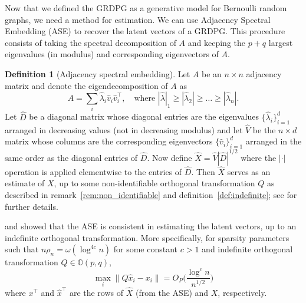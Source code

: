 \documentclass[
  11pt,
]{article}
\theoremstyle{definition}
\newtheorem{definition}{Definition}[section]
\theoremstyle{definition}
\theoremstyle{definition}
\theoremstyle{definition}
\theoremstyle{remark}
\begin{document}
Now that we defined the GRDPG as a generative model for Bernoulli random graphs,
we need a method for estimation.
We can use Adjacency Spectral Embedding (ASE) \citep{doi:10.1080/01621459.2012.699795} to recover the latent vectors of a GRDPG.
This procedure consists of taking the spectral decomposition of \(A\) and keeping the \(p + q\) largest eigenvalues (in modulus) and corresponding eigenvectors of \(A\).

\begin{definition}[Adjacency spectral embedding]
\label{def:ase}
Let $A$ be an $n
\times n$ adjacency matrix and denote the
eigendecomposition of $A$ as
$$A = \sum_{i} \hat{\lambda}_i \hat{v}_i \hat{v}_i^{\top}, \quad
\text{where} \,\,
|\hat{\lambda}|_1 \geq |\hat{\lambda}_2| \geq \dots \geq
|\hat{\lambda}_n|.$$
Let $\hat{D}$ be a diagonal matrix whose diagonal entries are
the eigenvalues $\{\hat{\lambda}_i\}_{i=1}^{d}$ arranged in decreasing values (not in
decreasing modulus) and let $\hat{V}$ be the $n \times d$ matrix whose
columns are the corresponding eigenvectors $\{\hat{v}_i\}_{i=1}^{d}$
arranged in the same order as the diagonal entries of $\hat{D}$. Now
define $\hat{X} = \hat{V} |\hat{D}|^{1/2}$ where the $|\cdot|$
operation is applied elementwise to the entries of $\hat{D}$. Then
$\hat{X}$ serves as an estimate of $X$, up to some non-identifiable
orthogonal transformation $Q$ as described in
remark~\ref{rem:non_identifiable} and definition~\ref{def:indefinite};
see \citet{rubindelanchy2017statistical} for further details.
\end{definition}

\citet{doi:10.1080/01621459.2012.699795} and \citet{rubindelanchy2017statistical} showed that the ASE is consistent in estimating the latent vectors, up to an indefinite orthogonal transformation.
More specifically, for sparsity parameters such that \(n \rho_n = \omega (\log^{4 c} n)\) for some constant \(c > 1\) and indefinite orthogonal transformation \(Q \in \mathbb{O}(p, q)\),
\[\max_i \|Q \hat{x}_i - x_i \| = O_P \bigg( \frac{\log^c n}{n^{1/2}} \bigg)\]
where \(x^\top\) and \(\hat{x}^\top\) are the rows of \(\hat{X}\) (from the ASE) and \(X\), respectively.
\end{document}
